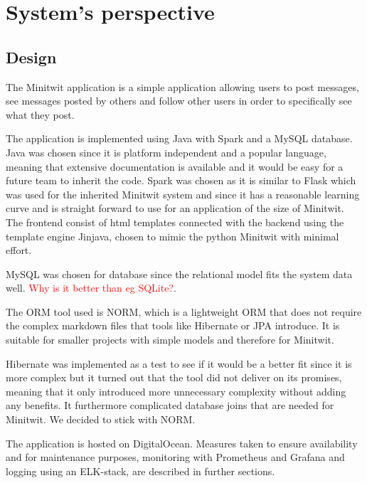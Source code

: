 \section{System's perspective} \label{section:System perspective}
\subsection{Design}
The Minitwit application is a simple application allowing users to post messages, see messages posted by others and follow other users in order to specifically see what they post.

The application is implemented using Java with Spark and a MySQL database. Java was chosen since it is platform independent and a popular language, meaning that extensive documentation is available and it would be easy for a future team to inherit the code. Spark was chosen as it is similar to Flask which was used for the inherited Minitwit system and since it has a reasonable learning curve and is straight forward to use for an application of the size of Minitwit. The frontend consist of html templates connected with the backend using the template engine Jinjava, chosen to mimic the python Minitwit with minimal effort. 

MySQL was chosen for database since the relational model fits the system data well. \textcolor{red}{Why is it better than eg SQLite?}. 

The ORM tool used is NORM, which is a lightweight ORM that does not require the complex markdown files that tools like Hibernate or JPA introduce. It is suitable for smaller projects with simple models and therefore for Minitwit.

Hibernate was implemented as a test to see if it would be a better fit since it is more complex but it turned out that the tool did not deliver on its promises, meaning that it only introduced more unnecessary complexity without adding any benefits. It furthermore complicated database joins that are needed for Minitwit. We decided to stick with NORM.

The application is hosted on DigitalOcean. Measures taken to ensure availability and for maintenance purposes, monitoring with Prometheus and Grafana and logging using an ELK-stack, are described in further sections.



